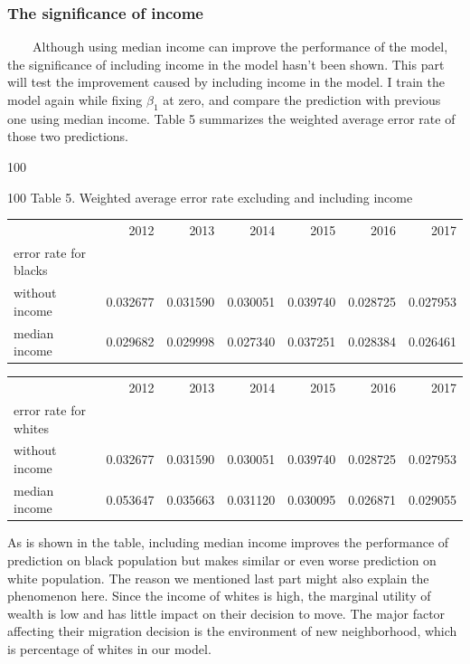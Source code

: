 \documentclass{article}
\begin{document}
\subsubsection{The significance of income}
\ \ \ \ Although using median income can improve the performance of the model, the significance of including income in the model hasn't been shown. This part will test the improvement caused by including income in the model. I train the model again while fixing $\beta_1$ at zero, and compare the prediction with previous one using median income. Table 5 summarizes the weighted average error rate of those two predictions.
\par {\color{white} 100}
\par \centerline{{\color{white} 100} Table 5. Weighted average error rate excluding and including income}
\begin{table}[!h]
\begin{tabular}{lrrrrrr}
\toprule
{} &      2012 &      2013 &      2014 &      2015 &      2016 &      2017 \\
error rate for blacks &           &           &           &           &           &           \\
\midrule
without income      &  0.032677 &  0.031590 &  0.030051 &  0.039740 &  0.028725 &  0.027953 \\
median income      &  0.029682 &  0.029998 &  0.027340 &  0.037251 &  0.028384 &  0.026461 \\
\bottomrule
\end{tabular}
\begin{tabular}{lrrrrrr}
\toprule
{} &      2012 &      2013 &      2014 &      2015 &      2016 &      2017 \\
error rate for whites &           &           &           &           &           &           \\
\midrule
without income      &  0.032677 &  0.031590 &  0.030051 &  0.039740 &  0.028725 &  0.027953 \\
median income      &  0.053647 &  0.035663 &  0.031120 &  0.030095 &  0.026871 &  0.029055 \\
\bottomrule
\end{tabular}
\end{table}
\par As is shown in the table, including median income improves the performance of prediction on black population but makes similar or even worse prediction on white population. The reason we mentioned last part might also explain the phenomenon here. Since the income of whites is high, the marginal utility of wealth is low and has little impact on their decision to move. The major factor affecting their migration decision is the environment of new neighborhood, which is percentage of whites in our model. 
\end{document}
